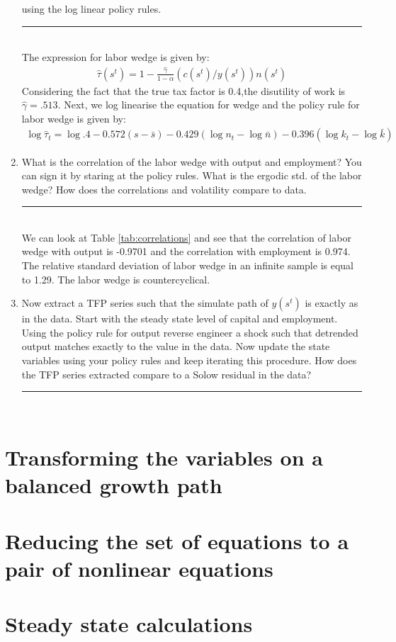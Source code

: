 \documentclass[11pt,letterpaper]{article}
\newcommand{\Hline}{\noindent\rule{17cm}{0.5pt}}
\begin{document}
\begin{enumerate}
  using the log linear policy rules. \\ \Hline \\
The expression for labor wedge is given by:
\begin{align*}
  \hat{\tau}(s^t) = 1 - \frac{\hat \gamma}{1-\alpha}(c(s^t)/y(s^t))n(s^t)
\end{align*}
Considering the fact that the true tax factor is 0.4,the disutility of
work is $\hat \gamma = .513$. Next, we log linearise the equation for
wedge and the policy rule for labor wedge is given by:
\begin{align*}
  \log \hat \tau_t = \log .4 -0.572(s-\bar s) -0.429 (\log n_t - \log \bar n) -0.396
  (\log k_t - \log \bar k)
\end{align*}
\item What is the correlation of the labor wedge with output and
  employment? You can sign it by staring at the policy rules. What is
  the ergodic std. of the labor wedge? How does the correlations and
  volatility compare to data. \\ \Hline \\
We can look at Table \ref{tab:correlations} and see that the
correlation of labor wedge with output is -0.9701 and the correlation with
employment is 0.974. The relative standard deviation of labor wedge in an
infinite sample is equal to 1.29. The labor wedge is countercyclical.
\item Now extract a TFP series such that the simulate path of $y(s^t)$
  is exactly as in the data. Start with the steady state level of
  capital and employment. Using the policy rule for output reverse
  engineer a shock such that detrended output matches exactly to the
  value in the data. Now update the state variables using your policy
  rules and keep iterating this procedure. How does the TFP series
  extracted compare to a Solow residual in the data? \\ \Hline \\ 
\end{enumerate}
\newpage
\begin{appendices}
  \section{Transforming the variables on a balanced growth
    path} \label{appendix:a}
  \section{Reducing the set of equations to a pair of nonlinear
    equations} \label{appendix:b}
  \section{Steady state calculations} \label{appendix:c}
\end{appendices}
\end{document}
